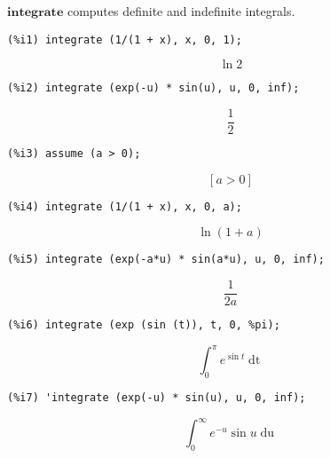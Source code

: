 \documentclass[12pt,leqno]{article}
\begin{document}
$\mathbf{integrate}$ computes definite and indefinite integrals.
\begin{verbatim}
(%i1) integrate (1/(1 + x), x, 0, 1);
\end{verbatim}
\begin{dmath}[number={\(\mathop{\mathrm{\%o}_{1}}\)}]
\ln 2
\end{dmath}
\begin{verbatim}
(%i2) integrate (exp(-u) * sin(u), u, 0, inf);
\end{verbatim}
\begin{dmath}[number={\(\mathop{\mathrm{\%o}_{2}}\)}]
\frac{1}{2}
\end{dmath}
\begin{verbatim}
(%i3) assume (a > 0);
\end{verbatim}
\begin{dmath}[number={\(\mathop{\mathrm{\%o}_{3}}\)}]
\left[a > 0\right]
\end{dmath}
\begin{verbatim}
(%i4) integrate (1/(1 + x), x, 0, a);
\end{verbatim}
\begin{dmath}[number={\(\mathop{\mathrm{\%o}_{4}}\)}]
\ln \left(1+a\right)
\end{dmath}
\begin{verbatim}
(%i5) integrate (exp(-a*u) * sin(a*u), u, 0, inf);
\end{verbatim}
\begin{dmath}[number={\(\mathop{\mathrm{\%o}_{5}}\)}]
\frac{1}{2 a}
\end{dmath}
\begin{verbatim}
(%i6) integrate (exp (sin (t)), t, 0, %pi);
\end{verbatim}
\begin{dmath}[number={\(\mathop{\mathrm{\%o}_{6}}\)}]
\int_{0}^{\pi} {e}^{\sin t}\mathop{\mathrm{d}t}
\end{dmath}
\begin{verbatim}
(%i7) 'integrate (exp(-u) * sin(u), u, 0, inf);
\end{verbatim}
\begin{dmath}[number={\(\mathop{\mathrm{\%o}_{7}}\)}]
\int_{0}^{\infty} {e}^{-u} \sin u\mathop{\mathrm{d}u}
\end{dmath}
\end{document}
